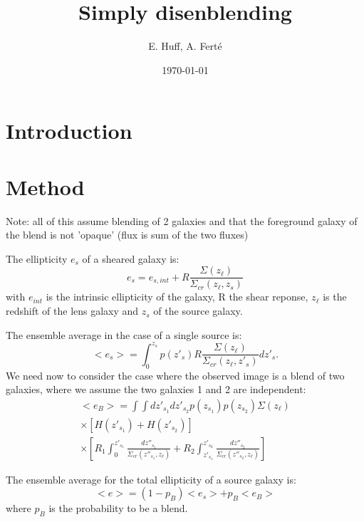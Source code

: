 \documentclass[prd,amsmath,aps,floats,amssymb, floatfix, superscriptaddress,nofootinbib,preprintnumbers,twocolumn]{article}  %
\title{Simply disenblending}
\date{\today}
\author{E. Huff, A. Fert\'e}
\begin{document}
\maketitle



\section{Introduction}
\label{sec:intro}

\section{Method}
\label{sec:method}


Note: all of this assume blending of 2 galaxies and that the foreground galaxy of the blend is not 'opaque' (flux is sum of the two fluxes) 

The ellipticity $e_s$ of a sheared galaxy is: 
\begin{equation}
e_s = e_{s,int} + R \frac{\Sigma (z_{\ell})}{\Sigma_{cr}(z_{\ell},z_s)}
\end{equation}
with $e_{int}$ is the intrinsic ellipticity of the galaxy, R the shear reponse, $z_{\ell}$ is the redshift of the lens galaxy and $z_s$ of the source galaxy.

The ensemble average in the case of a single source is: 
\begin{equation}
<e_s> = \int_0^{z_s} p(z'_s) R \frac{\Sigma (z_{\ell})}{\Sigma_{cr}(z_{\ell},z'_s)} dz'_s.
\end{equation}
We need now to consider the case where the observed image is a blend of two galaxies, where we assume the two galaxies 1 and 2 are independent: 
\begin{multline}
<e_B>  = \int \int dz'_{s_1} dz'_{s_2} p(z_{s_1})p(z_{s_2}) \Sigma(z_{\ell}) \\
\times [H(z'_{s_1}) + H(z'_{s_2})]  \\
\times [ R_1 \int_0^{z'_{s_1}} \frac{dz''_{s_1}}{\Sigma_{cr}(z''_{s_1},z_{\ell})} 
+ R_2 \int_{z'_{s_1}}^{z'_{s_2}} \frac{dz''_{s_2}}{\Sigma_{cr}(z''_{s_2},z_{\ell})}  ]
\label{eq:ellblend}
\end{multline}


The ensemble average for the total ellipticity of a source galaxy is: 
\begin{equation}
<e> = (1 - p_B) <e_s> + p_B <e_B> 
\end{equation}
where $p_B$ is the probability to be a blend. 
\end{document}
